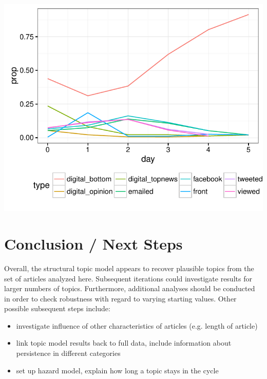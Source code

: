 \documentclass[12pt]{article}\usepackage[]{graphicx}\usepackage[]{color}
\makeatletter
\def\maxwidth{ %
  \ifdim\Gin@nat@width>\linewidth
    \linewidth
  \else
    \Gin@nat@width
  \fi
}
\newenvironment{knitrout}{}{} %
\makeatother
\begin{document}
\begin{knitrout}
\color{fgcolor}
\includegraphics[width=\maxwidth]{figure/unnamed-chunk-11-1} 

\end{knitrout}





\clearpage
\section{Conclusion / Next Steps}
Overall, the structural topic model appears to recover plausible topics from the set of articles analyzed here. Subsequent iterations could investigate results for larger numbers of topics. Furthermore, additional analyses should be conducted in order to check robustness with regard to varying starting values. Other possible subsequent steps include:
\begin{itemize}
  \item investigate influence of other characteristics of articles (e.g. length of article)
  \item link topic model results back to full data, include information about persistence in different categories
  \item set up hazard model, explain how long a topic stays in the cycle
\end{itemize}




\end{document}
